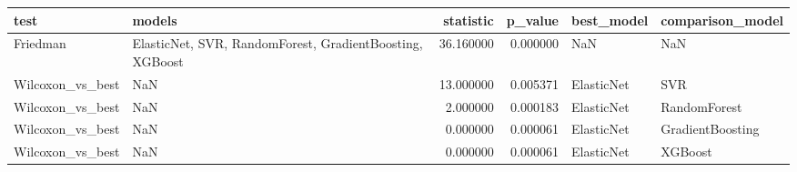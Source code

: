 \begin{tabular}{llrrll}
\toprule
test & models & statistic & p\_value & best\_model & comparison\_model \\
\midrule
Friedman & ElasticNet, SVR, RandomForest, GradientBoosting, XGBoost & 36.160000 & 0.000000 & NaN & NaN \\
Wilcoxon\_vs\_best & NaN & 13.000000 & 0.005371 & ElasticNet & SVR \\
Wilcoxon\_vs\_best & NaN & 2.000000 & 0.000183 & ElasticNet & RandomForest \\
Wilcoxon\_vs\_best & NaN & 0.000000 & 0.000061 & ElasticNet & GradientBoosting \\
Wilcoxon\_vs\_best & NaN & 0.000000 & 0.000061 & ElasticNet & XGBoost \\
\bottomrule
\end{tabular}
